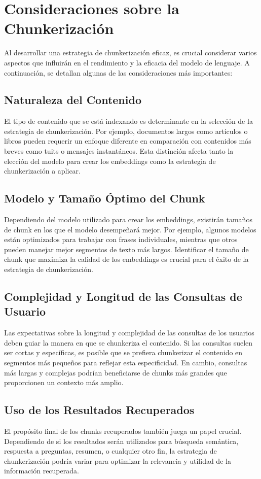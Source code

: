 \section{Consideraciones sobre la Chunkerización}

Al desarrollar una estrategia de chunkerización eficaz, es crucial considerar varios aspectos que influirán en el rendimiento y la eficacia del modelo de lenguaje. A continuación, se detallan algunas de las consideraciones más importantes:

\subsection{Naturaleza del Contenido}
El tipo de contenido que se está indexando es determinante en la selección de la estrategia de chunkerización. Por ejemplo, documentos largos como artículos o libros pueden requerir un enfoque diferente en comparación con contenidos más breves como tuits o mensajes instantáneos. Esta distinción afecta tanto la elección del modelo para crear los embeddings como la estrategia de chunkerización a aplicar.

\subsection{Modelo y Tamaño Óptimo del Chunk}
Dependiendo del modelo utilizado para crear los embeddings, existirán tamaños de chunk en los que el modelo desempeñará mejor. Por ejemplo, algunos modelos están optimizados para trabajar con frases individuales, mientras que otros pueden manejar mejor segmentos de texto más largos. Identificar el tamaño de chunk que maximiza la calidad de los embeddings es crucial para el éxito de la estrategia de chunkerización.

\subsection{Complejidad y Longitud de las Consultas de Usuario}
Las expectativas sobre la longitud y complejidad de las consultas de los usuarios deben guiar la manera en que se chunkeriza el contenido. Si las consultas suelen ser cortas y específicas, es posible que se prefiera chunkerizar el contenido en segmentos más pequeños para reflejar esta especificidad. En cambio, consultas más largas y complejas podrían beneficiarse de chunks más grandes que proporcionen un contexto más amplio.

\subsection{Uso de los Resultados Recuperados}
El propósito final de los chunks recuperados también juega un papel crucial. Dependiendo de si los resultados serán utilizados para búsqueda semántica, respuesta a preguntas, resumen, o cualquier otro fin, la estrategia de chunkerización podría variar para optimizar la relevancia y utilidad de la información recuperada.

